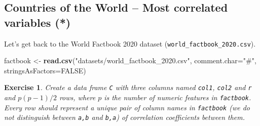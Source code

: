 \documentclass[10pt,b5paper,krantz1]{krantz}
\newenvironment{Shaded}{\begin{snugshade}}{\end{snugshade}}
\newcommand{\DataTypeTok}[1]{\textcolor[rgb]{0.27,0.27,0.27}{#1}}
\newcommand{\KeywordTok}[1]{\textcolor[rgb]{0.27,0.27,0.27}{\textbf{#1}}}
\newcommand{\NormalTok}[1]{#1}
\newcommand{\OtherTok}[1]{\textcolor[rgb]{0.37,0.37,0.37}{#1}}
\newcommand{\StringTok}[1]{\textcolor[rgb]{0.5,0.5,0.5}{#1}}
\newtheorem{exercise}{Exercise}[chapter]
\begin{document}
\hypertarget{countries-of-the-world-most-correlated-variables}{%
\subsection{Countries of the World -- Most correlated variables (*)}\label{countries-of-the-world-most-correlated-variables}}

Let's get back to the World Factbook 2020 dataset (\texttt{world\_factbook\_2020.csv}).

\begin{Shaded}
\begin{Highlighting}[]
\NormalTok{factbook <-}\StringTok{ }\KeywordTok{read.csv}\NormalTok{(}\StringTok{"datasets/world_factbook_2020.csv"}\NormalTok{,}
    \DataTypeTok{comment.char=}\StringTok{"#"}\NormalTok{, }\DataTypeTok{stringsAsFactors=}\OtherTok{FALSE}\NormalTok{)}
\end{Highlighting}
\end{Shaded}

\begin{exercise}

Create a data frame \texttt{C} with three columns named \texttt{col1}, \texttt{col2}
and \texttt{r} and \(p(p-1)/2\) rows,
where \(p\) is the number of numeric features in \texttt{factbook}.
Every row should represent a unique pair of column names in \texttt{factbook}
(we do not distinguish between \texttt{a,b} and \texttt{b,a})
of correlation coefficients between them.

\end{exercise}
\end{document}
